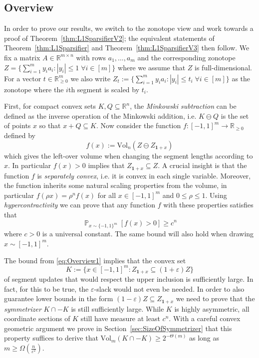 \documentclass[12pt,english]{article}
\theoremstyle{theorem}
\theoremstyle{remark}
\providecommand{\setR}{\mathbb{R}}
\newcommand{\Vol}{\mathrm{Vol}}
\renewcommand{\Pr}{\mathop{\mathbb{P}}}
\begin{document}
\subsection{Overview}
In order to prove our results, we switch to the zonotope view and work towards a proof of Theorem~\ref{thm:L1SparsifierV2}; the equivalent statements of Theorem~\ref{thm:L1Sparsifier} and Theorem~\ref{thm:L1SparsifierV3} then follow. We fix a matrix $A \in \setR^{m \times n}$ with rows $a_1,\ldots,a_m$ and the corresponding zonotope $Z = \{ \sum_{i=1}^m y_ia_i : |y_i| \leq 1\; \forall i \in [m]\}$ where we assume that $Z$ is full-dimensional. For a vector $t \in \setR_{\geq 0}^m$ we also write $Z_t := \{ \sum_{i=1}^m y_ia_i : |y_i| \leq t_i \; \forall i \in [m] \}$ as the zonotope where the $i$th segment is scaled by $t_i$.

First, for compact convex sets $K,Q \subseteq \setR^n$, the \emph{Minkowski subtraction} 
can be defined as the inverse operation of the Minkowski addition, i.e. $K \ominus Q$ is the set of points
$x$ so that $x + Q \subseteq K$. Now consider the function $f : [-1,1]^m \to \setR_{\geq 0}$ defined by
\[
  f(x) := \Vol_n(Z \ominus Z_{\bm{1}+x})
\]
which gives the left-over volume when changing the segment lengths according to $x$. In particular $f(x) > 0$
implies that $Z_{\bm{1}+x} \subseteq Z$. A crucial insight is that the function $f$ is \emph{separately convex}, i.e. it is convex in each single variable. Moreover, the function inherits some natural scaling properties from the volume, in particular $f(\rho x) = \rho^n f(x)$ for all $x \in [-1,1]^m$ and $0 \leq \rho \leq 1$. Using \emph{hypercontractivity} we can prove that any function $f$ with these properties satisfies that
\begin{equation} \label{eq:Overview1}
  \Pr_{x \sim \{ -1,1\}^m}[f(x) > 0] \geq c^n
\end{equation}
where $c>0$ is a universal constant. The same bound will also hold when drawing $x \sim [-1,1]^m$.

The bound from \eqref{eq:Overview1} implies that the convex set
\[
 K := \big\{ x \in [-1,1]^m : Z_{\bm{1}+x} \subseteq (1+\varepsilon) Z \big\}
\]
of segment updates that would respect the upper inclusion is sufficiently large. In fact, for this to be true, 
the $\varepsilon$-slack would not even be needed. 
In order to also guarantee lower bounds in the form $(1-\varepsilon) Z \subseteq Z_{\bm{1}+x}$ we need to prove that the \emph{symmetrizer} $K \cap -K$ is still sufficiently large. While $K$ is highly asymmetric, all coordinate sections of $K$ still have measure at least $c^n$. With a careful convex geometric argument we prove in Section~\ref{sec:SizeOfSymmetrizer} that this property suffices to derive that $\Vol_m(K \cap -K) \geq 2^{-\Theta(m)}$ as long as $m \geq \Omega(\frac{n}{\varepsilon^2})$.
\end{document}
